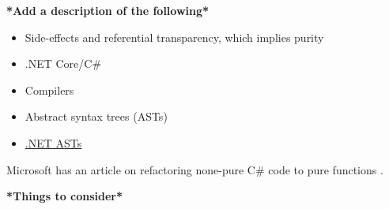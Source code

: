 \documentclass[a4paper,12pt]{article}
\begin{document}
\noindent\makebox[\linewidth]{\rule{\textwidth}{0.4pt}} %

\textbf{*Add a description of the following*}
\begin{itemize}
  \item Side-effects and referential transparency, which implies purity~\cite{purity-in-javascript}
  \item .NET Core/C\#
  \item Compilers
  \item Abstract syntax trees (ASTs)
  \item \href{https://docs.microsoft.com/en-us/dotnet/csharp/roslyn-sdk/work-with-syntax}{.NET ASTs}~\cite{albahari2003nutshell}
\end{itemize}

Microsoft has an article on refactoring none-pure C\# code to pure functions \cite{microsoft-refactoring}.

\textbf{*Things to consider*}
\end{document}
